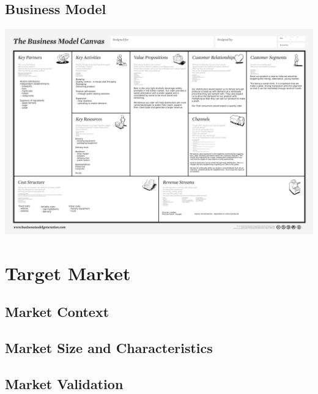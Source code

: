 \documentclass[11pt]{article}
\begin{document}
  \newpage
  \subsection{Business Model}
  \includegraphics[angle=90,width=\textwidth,height=\textheight,keepaspectratio]{./business_model_canvas_poster.png}

\newpage
\section{Target Market}
  \subsection{Market Context}
  \subsection{Market Size and Characteristics}
  \subsection{Market Validation}

\newpage
\end{document}
